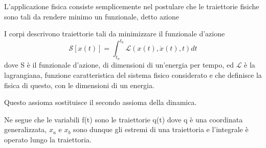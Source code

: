 \documentclass[
10pt, %
a4paper, %
oneside, %
headinclude,footinclude, %
BCOR5mm, %
]{scrartcl}
\begin{document}
L'applicazione fisica consiste semplicemente nel postulare che le traiettorie fisiche sono tali da rendere minimo un funzionale, detto azione
\begin{assioma}
	I corpi descrivono traiettorie tali da minimizzare il funzionale d'azione
	\[\mathcal{S}[x(t)]=\int_{t_a}^{t_b}\mathcal{L}(x(t), \dot{x}(t), t)dt\]
	dove S è il funzionale d'azione, di dimensioni di un'energia per tempo, ed $\mathcal{L}$ è la lagrangiana, funzione caratteristica del sistema fisico considerato e che definisce la fisica di questo, con le dimensioni di un energia.
\end{assioma}
\begin{osservazione}
	Questo assioma sostituisce il secondo assioma della dinamica.
\end{osservazione}
Ne segue che le variabili f(t) sono le traiettorie q(t) dove q è una coordinata generalizzata, \(x_a\) e \(x_b\) sono dunque gli estremi di una traiettoria e l'integrale è operato lungo la traiettoria.
\end{document}
